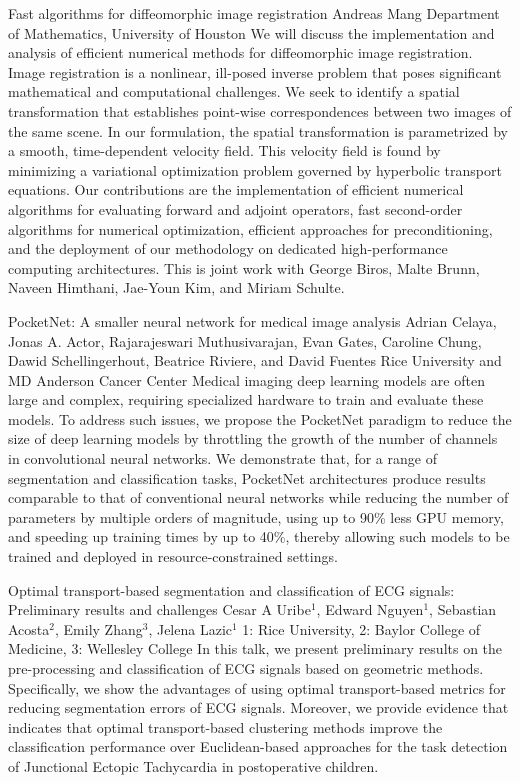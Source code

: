 \begin{addmargin}[2em]{0em}
\vspace{1.5ex}
\abs
{Fast algorithms for diffeomorphic image registration}
{Andreas Mang}
{Department of Mathematics, University of Houston}
{We will discuss the implementation and analysis of efficient numerical methods for diffeomorphic image registration. Image registration is a nonlinear, ill-posed inverse problem that poses significant mathematical and computational challenges. We seek to identify a spatial transformation that establishes point-wise correspondences between two images of the same scene. In our formulation, the spatial transformation is parametrized by a smooth, time-dependent velocity field. This velocity field is found by minimizing a variational optimization problem governed by hyperbolic transport equations. Our contributions are the implementation of efficient numerical algorithms for evaluating forward and adjoint operators, fast second-order algorithms for numerical optimization, efficient approaches for preconditioning, and the deployment of our methodology on dedicated high-performance computing architectures. This is joint work with George Biros, Malte Brunn, Naveen Himthani, Jae-Youn Kim, and Miriam Schulte.}


\vspace{1.5ex}
\abs
{PocketNet: A smaller neural network for medical image analysis}
{Adrian Celaya, Jonas A. Actor, Rajarajeswari Muthusivarajan, Evan
Gates, Caroline Chung, Dawid Schellingerhout, Beatrice Riviere, and
David Fuentes}
{Rice University and MD Anderson Cancer Center}
{Medical imaging deep learning models are often large and complex,
requiring specialized hardware to train and evaluate these models. To
address such issues, we propose the PocketNet paradigm to reduce the
size of deep learning models by throttling the growth of the number of
channels in convolutional neural networks. We demonstrate that, for a
range of segmentation and classification tasks, PocketNet
architectures produce results comparable to that of conventional
neural networks while reducing the number of parameters by multiple
orders of magnitude, using up to 90\% less GPU memory, and speeding up
training times by up to 40\%, thereby allowing such models to be
trained and deployed in resource-constrained settings.}


\vspace{1.5ex}
\abs
{Optimal transport-based segmentation and classification of ECG signals: Preliminary results and challenges}
{Cesar A Uribe$^{1}$, Edward Nguyen$^{1}$, Sebastian Acosta$^{2}$, Emily Zhang$^{3}$, Jelena Lazic$^{1}$}
{1: Rice University, 2: Baylor College of Medicine, 3: Wellesley College}
{In this talk, we present preliminary results on the pre-processing and classification of ECG signals based on geometric methods. Specifically, we show the advantages of using optimal transport-based metrics for reducing segmentation errors of ECG signals. Moreover, we provide evidence that indicates that optimal transport-based clustering methods improve the classification performance over Euclidean-based approaches for the task detection of Junctional Ectopic Tachycardia in postoperative children.}



\end{addmargin}
